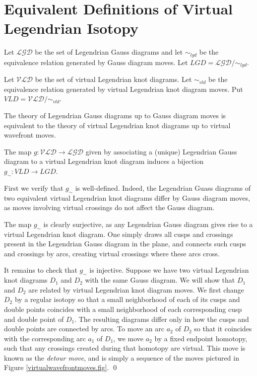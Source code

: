 \section{Equivalent Definitions of Virtual Legendrian Isotopy}
 Let $\mathcal{LGD}$ be the set of Legendrian Gauss diagrams and let $\sim_{lgd}$ be the equivalence relation generated by Gauss diagram moves.  Let $LGD=\mathcal{LGD}/ \sim_{lgd}$.  

Let $\mathcal{VLD}$ be the set of virtual Legendrian knot diagrams.  Let $\sim_{vld}$ be the equivalence relation generated by virtual Legendrian knot diagram moves.  Put $VLD=\mathcal{VLD}/\sim_{vld}$.

The theory of Legendrian Gauss diagrams up to Gauss diagram moves is equivalent to the theory of virtual Legendrian knot diagrams up to virtual wavefront moves.

\begin{thm}  The map $g: \mathcal{VLD}\rightarrow \mathcal{LGD}$ given by associating a (unique) Legendrian Gauss diagram to a virtual Legendrian knot diagram induces a bijection $g_\sim :VLD\rightarrow LGD$.
 \end{thm}
\pp  
First we verify that $g_\sim$ is well-defined.  Indeed, the Legendrian Guass diagrams of two equivalent virtual Legendrian knot diagrams differ by Gauss diagram moves, as moves involving virtual crossings do not affect the Gauss diagram.  

The map $g_\sim$ is clearly surjective, as any Legendrian Gauss diagram gives rise to a virtual Legendrian knot diagram.  One simply draws all cusps and crossings present in the Legendrian Gauss diagram in the plane, and connects such cusps and crossings by arcs, creating virtual crossings where these arcs cross.

It remains to check that $g_\sim$ is injective.  Suppose we have two virtual Legendrian knot diagrams $D_1$ and $D_2$ with the same Gauss diagram.  We will show that $D_1$ and $D_2$ are related by virtual Legendrian knot diagram moves.  We first change $D_2$ by a regular isotopy so that a small neighborhood of each of its cusps and double points coincides with a small neighborhood of each corresponding cusp and double point of $D_1$.  The resulting diagrams differ only in how the cusps and double points are connected by arcs.  To move an arc $a_2$ of $D_2$ so that it coincides with the corresponding arc $a_1$ of $D_1$, we move $a_2$ by a fixed endpoint homotopy, such that any crossings created during that homotopy are virtual.  This move is known as the {\it detour move}, and is simply a sequence of the moves pictured in Figure \ref{virtualwavefrontmoves.fig}. 
\qed

